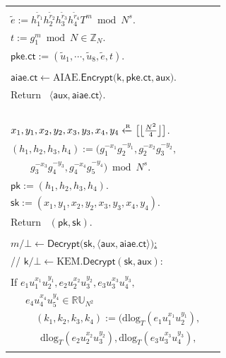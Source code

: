 {\begin{figure}[!h]
{\begin{tabular}{|l|l|}
{{{~~~~$g_2^{\tilde{r}_2}, g_3^{\tilde{r}_2}, g_3^{\tilde{r}_3}, g_4^{\tilde{r}_3}, g_4^{\tilde{r}_4}, g_5^{\tilde{r}_4}) \text{~mod~} N^s$. \\
$\tilde{e} := h_1^{\tilde{r}_1} h_2^{\tilde{r}_2} h_3^{\tilde{r}_3} h_4^{\tilde{r}_4} T^m \bmod N^s$. \\
$t := g_1^m \bmod N  \in \mathbb{Z}_N$. \\
$\mathsf{pke.ct} := (\tilde{u}_1, \cdots, \tilde{u}_8, \tilde{e}, t)$. \\ }~} \\
$\mathsf{aiae.ct} \leftarrow \text{AIAE}.\mathsf{Encrypt}\big(\mathsf{k},  \mathsf{pke.ct}, \mathsf{aux} \big)$. \\
Return~ $\langle \mathsf{aux}, \mathsf{aiae.ct} \rangle$.  \\
}~     &
~\makecell[l]{
\underline{$(\mathsf{pk}, \mathsf{sk}) \leftarrow \mathsf{KeyGen}(pp)$:}  \\
$x_1, y_1, x_2, y_2, x_3, y_3, x_4, y_4 \xleftarrow{\textup{\tiny R}} \big[ \big\lfloor \frac{N^2}{4} \big\rfloor \big]$. \\
$(h_{1}, h_2, h_3, h_4) := (g_1^{- x_1} {g}_2^{- y_1}, g_2^{- x_2} {g}_3^{- y_2},$ \\
~~~~$g_3^{- x_3} {g}_4^{- y_3}, g_4^{- x_4} {g}_5^{- y_4}) \bmod N^s$. \\
$\mathsf{pk} := (h_{1}, h_{2}, h_3, h_4)$. \\
$\mathsf{sk} := ( x_1, y_1, x_2, y_2, x_3, y_3, x_4, y_4 )$.  \\
Return~ $(\mathsf{pk}, \mathsf{sk})$. \\
\vspace{-5pt} \\
\underline{$m / \bot \leftarrow \mathsf{Decrypt}\big(\mathsf{sk}, \langle {\mathsf{aux}}, \mathsf{aiae.ct} \rangle\big)$:} \\
// $\mathsf{k} / \bot \leftarrow \text{KEM}.\mathsf{Decrypt}(\mathsf{sk}, {\mathsf{aux}})$: \\
\grabox{\makecell[l]{
Parse~ $\textsf{aux} = (u_1, \cdots, u_5, e_1, \cdots, e_4)$. \\
If $e_1 u_1^{x_1} {u}_2^{y_1}, e_2 u_2^{x_2} {u}_3^{y_2}, e_3 u_3^{x_3} {u}_4^{y_3},$ \\
~~~$e_4 u_4^{x_4} {u}_5^{y_4} \in \mathbb{RU}_{N^2}$ \\
~~~~~$(k_1, k_2, k_3, k_4) := \big(\text{dlog}_T (e_1 u_1^{x_1} {u}_2^{y_1}),$ \\
~~~~~~$\text{dlog}_T (e_2 u_2^{x_2} {u}_3^{y_2}), \text{dlog}_T (e_3 u_3^{x_3} {u}_4^{y_3}),$ \\
}}}
\end{tabular}}
\end{figure}}
